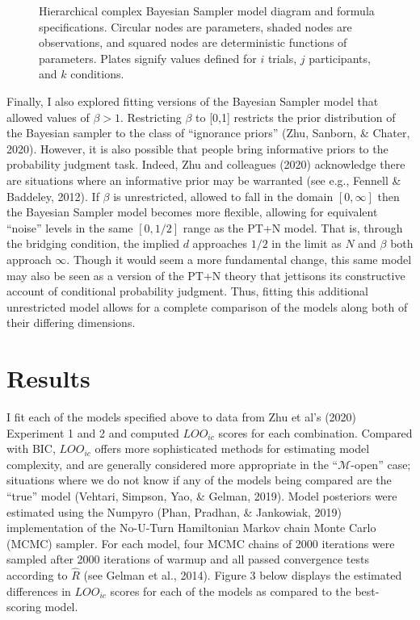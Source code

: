 \documentclass[
  english,
  man,floatsintext]{apa6}
\begin{document}
\begin{figure}
  \begin{minipage}{.5\textwidth}
    \flushright
    
  \end{minipage}%
  \begin{minipage}{.5\textwidth}
    \flushleft
    \small
    
  \end{minipage}
  \caption{Hierarchical complex Bayesian Sampler model diagram and formula specifications. Circular nodes are parameters, shaded nodes are observations, and squared nodes are deterministic functions of parameters. Plates signify values defined for $i$ trials, $j$ participants, and $k$ conditions.}
\end{figure}

Finally, I also explored fitting versions of the Bayesian Sampler model that allowed values of \(\beta > 1\). Restricting \(\beta\) to {[}0,1{]} restricts the prior distribution of the Bayesian sampler to the class of ``ignorance priors'' (Zhu, Sanborn, \& Chater, 2020). However, it is also possible that people bring informative priors to the probability judgment task. Indeed, Zhu and colleagues (2020) acknowledge there are situations where an informative prior may be warranted (see e.g., Fennell \& Baddeley, 2012). If \(\beta\) is unrestricted, allowed to fall in the domain \([0, \infty]\) then the Bayesian Sampler model becomes more flexible, allowing for equivalent ``noise'' levels in the same \([0, 1/2]\) range as the PT+N model. That is, through the bridging condition, the implied \(d\) approaches \(1/2\) in the limit as \(N\) and \(\beta\) both approach \(\infty\). Though it would seem a more fundamental change, this same model may also be seen as a version of the PT+N theory that jettisons its constructive account of conditional probability judgment. Thus, fitting this additional unrestricted model allows for a complete comparison of the models along both of their differing dimensions.

\hypertarget{results}{%
\section{Results}\label{results}}

I fit each of the models specified above to data from Zhu et al's (2020) Experiment 1 and 2 and computed \(LOO_{ic}\) scores for each combination. Compared with BIC, \(LOO_{ic}\) offers more sophisticated methods for estimating model complexity, and are generally considered more appropriate in the ``\(\mathcal{M}\)-open'' case; situations where we do not know if any of the models being compared are the ``true'' model (Vehtari, Simpson, Yao, \& Gelman, 2019). Model posteriors were estimated using the Numpyro (Phan, Pradhan, \& Jankowiak, 2019) implementation of the No-U-Turn Hamiltonian Markov chain Monte Carlo (MCMC) sampler. For each model, four MCMC chains of 2000 iterations were sampled after 2000 iterations of warmup and all passed convergence tests according to \(\hat{R}\) (see Gelman et al., 2014). Figure 3 below displays the estimated differences in \(LOO_{ic}\) scores for each of the models as compared to the best-scoring model.
\end{document}
